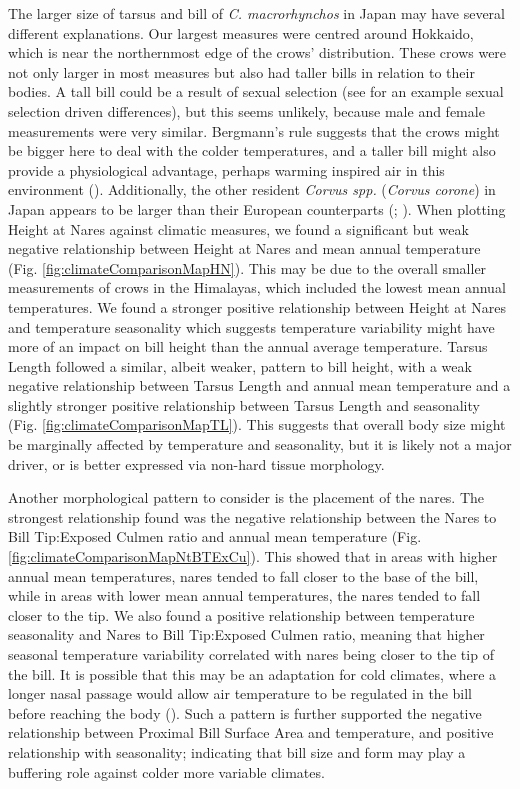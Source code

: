 \documentclass[10pt,a4paper]{article}
\begin{document}
The larger size of tarsus and bill of \emph{C. macrorhynchos} in Japan may have several different explanations.
Our largest measures were centred around Hokkaido, which is near the northernmost edge of the crows' distribution.
These crows were not only larger in most measures but also had taller bills in relation to their bodies.
A tall bill could be a result of sexual selection (see  for an example sexual selection driven differences), but this seems unlikely, because male and female measurements were very similar.
Bergmann's rule suggests that the crows might be bigger here to deal with the colder temperatures, and a taller bill might also provide a physiological advantage, perhaps warming inspired air in this environment ().
Additionally, the other resident \emph{Corvus spp.} (\emph{Corvus corone}) in Japan appears to be larger than their European counterparts (; ).
When plotting Height at Nares against climatic measures, we found a significant but weak negative relationship between Height at Nares and mean annual temperature (Fig. \ref{fig:climateComparisonMapHN}).
This may be due to the overall smaller measurements of crows in the Himalayas, which included the lowest mean annual temperatures.
We found a stronger positive relationship between Height at Nares and temperature seasonality which suggests temperature variability might have more of an impact on bill height than the annual average temperature.
Tarsus Length followed a similar, albeit weaker, pattern to bill height, with a weak negative relationship between Tarsus Length and annual mean temperature and a slightly stronger positive relationship between Tarsus Length and seasonality (Fig. \ref{fig:climateComparisonMapTL}).
This suggests that overall body size might be marginally affected by temperature and seasonality, but it is likely not a major driver, or is better expressed via non-hard tissue morphology.

Another morphological pattern to consider is the placement of the nares.
The strongest relationship found was the negative relationship between the Nares to Bill Tip:Exposed Culmen ratio and annual mean temperature (Fig. \ref{fig:climateComparisonMapNtBTExCu}).
This showed that in areas with higher annual mean temperatures, nares tended to fall closer to the base of the bill, while in areas with lower mean annual temperatures, the nares tended to fall closer to the tip.
We also found a positive relationship between temperature seasonality and Nares to Bill Tip:Exposed Culmen ratio, meaning that higher seasonal temperature variability correlated with nares being closer to the tip of the bill.
It is possible that this may be an adaptation for cold climates, where a longer nasal passage would allow air temperature to be regulated in the bill before reaching the body ().
Such a pattern is further supported the negative relationship between Proximal Bill Surface Area and temperature, and positive relationship with seasonality; indicating that bill size and form may play a buffering role against colder more variable climates.
\end{document}
